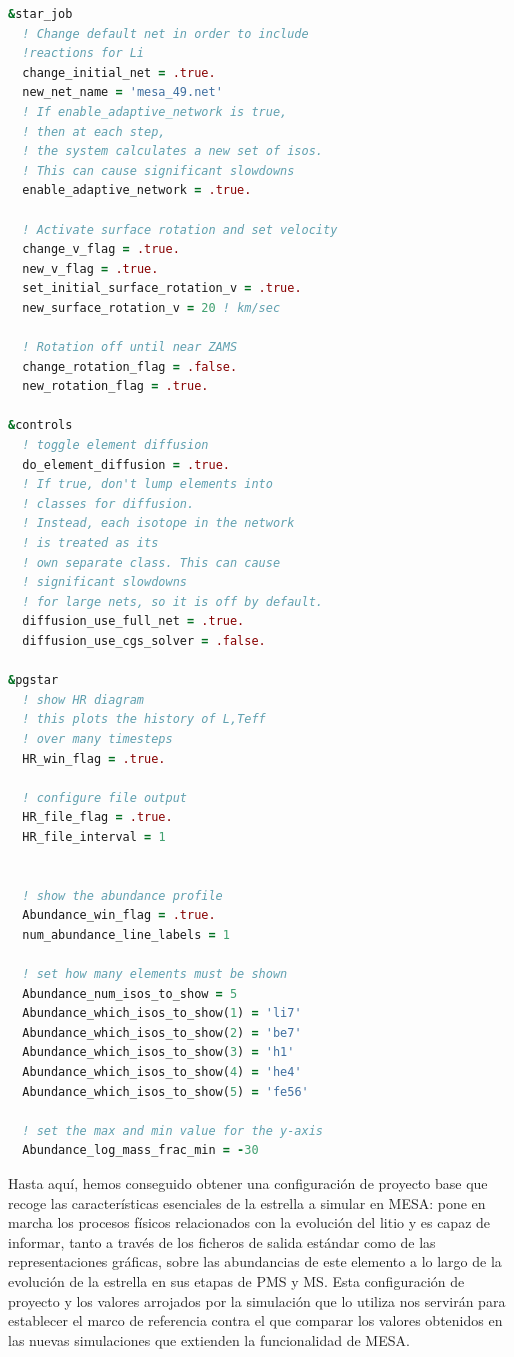\begin{lstlisting}[language=Fortran, float, caption={Parametrización de los procesos relacionados con el tratamiento del litio y su evolución temporal.}, label={lst:li_evol}]
&star_job
  ! Change default net in order to include 
  !reactions for Li
  change_initial_net = .true.
  new_net_name = 'mesa_49.net'
  ! If enable_adaptive_network is true, 
  ! then at each step, 
  ! the system calculates a new set of isos. 
  ! This can cause significant slowdowns
  enable_adaptive_network = .true.

  ! Activate surface rotation and set velocity
  change_v_flag = .true.
  new_v_flag = .true.
  set_initial_surface_rotation_v = .true.
  new_surface_rotation_v = 20 ! km/sec 

  ! Rotation off until near ZAMS
  change_rotation_flag = .false.
  new_rotation_flag = .true.

&controls
  ! toggle element diffusion
  do_element_diffusion = .true.
  ! If true, don't lump elements into 
  ! classes for diffusion. 
  ! Instead, each isotope in the network 
  ! is treated as its 
  ! own separate class. This can cause 
  ! significant slowdowns 
  ! for large nets, so it is off by default.
  diffusion_use_full_net = .true.
  diffusion_use_cgs_solver = .false.

&pgstar
  ! show HR diagram
  ! this plots the history of L,Teff 
  ! over many timesteps
  HR_win_flag = .true.

  ! configure file output 
  HR_file_flag = .true.
  HR_file_interval = 1


  ! show the abundance profile
  Abundance_win_flag = .true.
  num_abundance_line_labels = 1

  ! set how many elements must be shown
  Abundance_num_isos_to_show = 5
  Abundance_which_isos_to_show(1) = 'li7'
  Abundance_which_isos_to_show(2) = 'be7'
  Abundance_which_isos_to_show(3) = 'h1'
  Abundance_which_isos_to_show(4) = 'he4'
  Abundance_which_isos_to_show(5) = 'fe56'

  ! set the max and min value for the y-axis
  Abundance_log_mass_frac_min = -30
\end{lstlisting}

Hasta aquí, hemos conseguido obtener una configuración de proyecto base que recoge las características esenciales de la estrella a simular en MESA: pone en marcha los procesos físicos relacionados con la evolución del litio y es capaz de informar, tanto a través de los ficheros de salida estándar como de las representaciones gráficas, sobre las abundancias de este elemento a lo largo de la evolución de la estrella en sus etapas de PMS y MS. Esta configuración de proyecto y los valores arrojados por la simulación que lo utiliza nos servirán para establecer el marco de referencia contra el que comparar los valores obtenidos en las nuevas simulaciones que extienden la funcionalidad de MESA.\par


